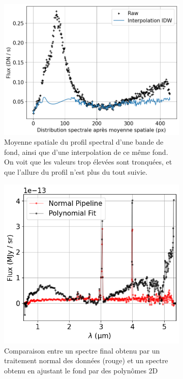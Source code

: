 \documentclass[12pt, a4paper]{article}
\begin{document}
\begin{figure}[!h]
  \centering
     \begin{subfigure}[t]{0.45\textwidth}
        \centering
        \includegraphics[scale=0.45]{assets/idw_interpolation.png}
        \caption{Moyenne spatiale du profil spectral d'une bande de fond, ainsi que d'une interpolation de ce même fond. On voit que les valeurs trop élevées sont tronquées, et que l'allure du profil n'est plus du tout suivie.}
        \label{fig:interpolation}
     \end{subfigure}
     \hfill
     \begin{subfigure}[t]{0.45\textwidth}
        \centering
        \includegraphics[scale=0.57]{assets/comparaison_normal_fit.png}
        \caption{Comparaison entre un spectre final obtenu par un traitement normal des données (rouge) et un spectre obtenu en ajustant le fond par des polynômes 2D}
        \label{fig:comparaison_fit_normal}
     \end{subfigure}
     \caption{}
\end{figure}
\end{document}
